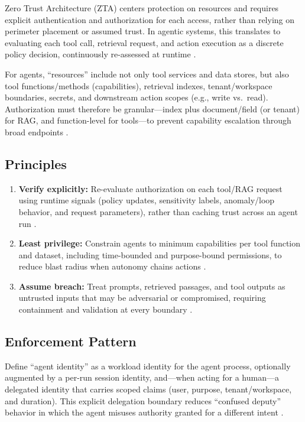 \begin{TNtwocol}
      Zero Trust Architecture (ZTA) centers protection on resources and requires explicit authentication and authorization for each access, rather than relying on perimeter placement or assumed trust. In agentic systems, this translates to evaluating each tool call, retrieval request, and action execution as a discrete policy decision, continuously re-assessed at runtime \cite{NIST_SP800_207}.

      For agents, ``resources'' include not only tool services and data stores, but also tool functions/methods (capabilities), retrieval indexes, tenant/workspace boundaries, secrets, and downstream action scopes (e.g., write vs.\ read). Authorization must therefore be granular---index plus document/field (or tenant) for RAG, and function-level for tools---to prevent capability escalation through broad endpoints \cite{NIST_SP800_207,OWASP_LLM_Top10}.

      \subsection{Principles}

      \begin{enumerate}
            \item \textbf{Verify explicitly:} Re-evaluate authorization on each tool/RAG request using runtime signals (policy updates, sensitivity labels, anomaly/loop behavior, and request parameters), rather than caching trust across an agent run \cite{NIST_SP800_207,CIS_Controls_v8_1}.

            \item \textbf{Least privilege:} Constrain agents to minimum capabilities per tool function and dataset, including time-bounded and purpose-bound permissions, to reduce blast radius when autonomy chains actions \cite{NIST_SP800_207}.

            \item \textbf{Assume breach:} Treat prompts, retrieved passages, and tool outputs as untrusted inputs that may be adversarial or compromised, requiring containment and validation at every boundary \cite{NIST_SP800_207,OWASP_LLM_Top10}.
      \end{enumerate}

      \subsection{Enforcement Pattern}

      Define ``agent identity'' as a workload identity for the agent process, optionally augmented by a per-run session identity, and---when acting for a human---a delegated identity that carries scoped claims (user, purpose, tenant/workspace, and duration). This explicit delegation boundary reduces ``confused deputy'' behavior in which the agent misuses authority granted for a different intent \cite{NIST_SP800_207,OWASP_LLM_Top10}.


\end{TNtwocol}
